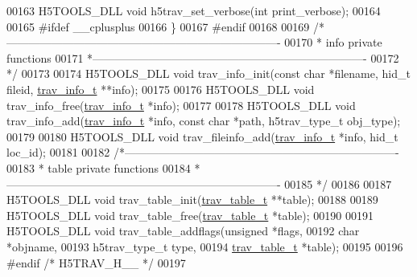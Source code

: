 \begin{DoxyCode}
00163 H5TOOLS\_DLL \textcolor{keywordtype}{void} h5trav\_set\_verbose(\textcolor{keywordtype}{int} print\_verbose);
00164 
00165 \textcolor{preprocessor}{#ifdef \_\_cplusplus}
00166 \}
00167 \textcolor{preprocessor}{#endif}
00168 
00169 \textcolor{comment}{/*-------------------------------------------------------------------------}
00170 \textcolor{comment}{ * info private functions}
00171 \textcolor{comment}{ *-------------------------------------------------------------------------}
00172 \textcolor{comment}{ */}
00173 
00174 H5TOOLS\_DLL \textcolor{keywordtype}{void} trav\_info\_init(\textcolor{keyword}{const} \textcolor{keywordtype}{char} *filename, hid\_t fileid, \hyperlink{structtrav__info__t}{trav\_info\_t} **info);
00175 
00176 H5TOOLS\_DLL \textcolor{keywordtype}{void} trav\_info\_free(\hyperlink{structtrav__info__t}{trav\_info\_t} *info);
00177 
00178 H5TOOLS\_DLL \textcolor{keywordtype}{void} trav\_info\_add(\hyperlink{structtrav__info__t}{trav\_info\_t} *info, \textcolor{keyword}{const} \textcolor{keywordtype}{char} *path, h5trav\_type\_t obj\_type);
00179 
00180 H5TOOLS\_DLL \textcolor{keywordtype}{void} trav\_fileinfo\_add(\hyperlink{structtrav__info__t}{trav\_info\_t} *info, hid\_t loc\_id);
00181 
00182 \textcolor{comment}{/*-------------------------------------------------------------------------}
00183 \textcolor{comment}{ * table private functions}
00184 \textcolor{comment}{ *-------------------------------------------------------------------------}
00185 \textcolor{comment}{ */}
00186 
00187 H5TOOLS\_DLL \textcolor{keywordtype}{void} trav\_table\_init(\hyperlink{structtrav__table__t}{trav\_table\_t} **table);
00188 
00189 H5TOOLS\_DLL \textcolor{keywordtype}{void} trav\_table\_free(\hyperlink{structtrav__table__t}{trav\_table\_t} *table);
00190 
00191 H5TOOLS\_DLL \textcolor{keywordtype}{void} trav\_table\_addflags(\textcolor{keywordtype}{unsigned} *flags,
00192                          \textcolor{keywordtype}{char} *objname,
00193                          h5trav\_type\_t type,
00194                          \hyperlink{structtrav__table__t}{trav\_table\_t} *table);
00195 
00196 \textcolor{preprocessor}{#endif  }\textcolor{comment}{/* H5TRAV\_H\_\_ */}\textcolor{preprocessor}{}
00197 
\end{DoxyCode}
